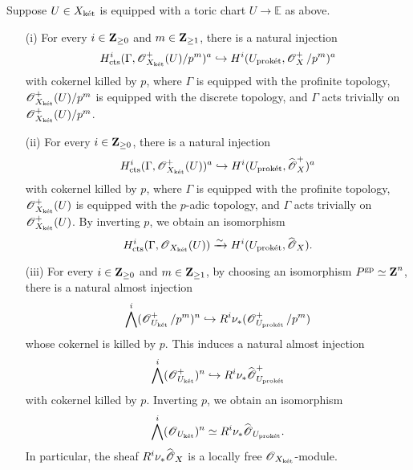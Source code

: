 \begin{Lemma}\label{Lemma: Cartan-Leray}
Suppose $U\in X_{\ket}$ is equipped with a toric chart $U\rightarrow \mathbb{E}$ as above. 
\begin{enumerate}
\item[(i)] For every $i\in \Z_{\geq 0}$ and $m\in\Z_{\geq 1}$, there is a natural injection
\[H^i_{\cts}(\Gamma, \scrO^+_{X_{\ket}}(U)/p^m)^a\hookrightarrow H^i(U_{\proket}, \scrO^+_{X}/p^m)^a\]
with cokernel killed by $p$, where $\Gamma$ is equipped with the profinite topology, $\scrO^+_{X_{\ket}}(U)/p^m$ is equipped with the discrete topology, and $\Gamma$ acts trivially on $\scrO^+_{X_{\ket}}(U)/p^m$.
\item[(ii)] 
For every $i\in\Z_{\geq 0}$, there is a natural injection
\[H^i_{\cts}(\Gamma, \scrO^+_{X_{\ket}}(U))^a\hookrightarrow H^i(U_{\proket}, \widehat{\scrO}^+_{X})^a\]
with cokernel killed by $p$, where $\Gamma$ is equipped with the profinite topology, $\scrO^+_{X_{\ket}}(U)$ is equipped with the $p$-adic topology, and $\Gamma$ acts trivially on $\scrO^+_{X_{\ket}}(U)$. By inverting $p$, we obtain an isomorphism
\[H^i_{\cts}(\Gamma, \scrO_{X_{\ket}}(U))\xrightarrow[]{\sim} H^i(U_{\proket}, \widehat{\scrO}_{X}).\]
\item[(iii)]
For every $i\in \Z_{\geq 0}$ and $m\in \Z_{\geq 1}$, by choosing an isomorphism $P^{\mathrm{gp}}\simeq \Z^n$, there is a natural almost injection $$\bigwedge^i (\scrO^+_{U_{\ket}}/p^m)^n\hookrightarrow R^i\nu_* (\scrO^+_{U_{\proket}}/p^m)$$ whose cokernel is killed by $p$. This induces a natural almost injection $$\bigwedge^i (\scrO^+_{U_{\ket}})^n\hookrightarrow R^i\nu_* \widehat{\scrO}^+_{U_{\proket}}$$
with cokernel killed by $p$. Inverting $p$, we obtain an isomorphism
$$\bigwedge^i (\scrO_{U_{\ket}})^n\simeq R^i\nu_* \widehat{\scrO}_{U_{\proket}}.$$ In particular, the sheaf $R^i\nu_*\widehat{\scrO}_{X}$ is a locally free $\scrO_{X_{\ket}}$-module. 
\end{enumerate}
\end{Lemma}

